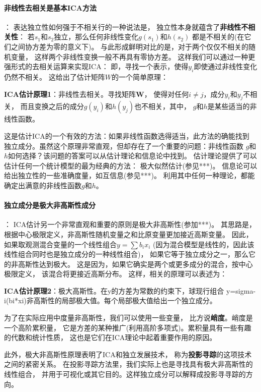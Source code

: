 \paragraph*{非线性去相关是基本ICA方法}：
表达独立性如何强于不相关行的一种说法是，
独立性本身就蕴含了\textbf{非线性不相关性}：
若$s_1$和$s_2$独立，那么任何非线性变化$g(s_1)$和$h(s_2)$
都是不相关的(在它们之间协方差为零的意义下)。
与此形成鲜明对比的是，对于两个仅仅不相关的随机变量，
这样两个非线性变换一般不再具有零协方差。
这样我们可以通过一种更强形式的去相关运算来实现ICA：
即，寻找一个表示，使得$y_i$即使通过非线性变化仍然不相关。
这给出了估计矩阵$W$的一个简单原理：

\textbf{ICA估计原理1}：非线性去相关。寻找矩阵$\bm{W}$，
使得对任何$i \ne j$，成分$y_i$和$y_j$不相关，
而且变换之后的成分$g(y_i)$和$h(y_j)$也不相关，其中，
$g$和$h$是某些适当的非线性函数。

这是估计ICA的一个有效的方法：如果非线性函数选得适当，此方法的确能找到
独立成分。虽然这个原理非常直观，但却存在了一个重要的问题：非线性函数
$g$和$h$如何选择？该问题的答案可以从估计理论和信息论中找到。
估计理论提供了可以估计任何一个统计模型的最为经典的方法：
极大似然估计(参见***)。
信息论可以给出独立性的一些准确度量，如互信息(参见***)。
利用其中任何一种理论，都能确定出满意的非线性函数$g$和$h$。
    
\paragraph*{独立成分是极大非高斯性成分}：
ICA估计另一个非常直观和重要的原则是极大非高斯性(参加***)。
其思路是，根据中心极限定义，非高斯性随机变量之和比原变量更加接近高斯变量。
因此，如果取观测混合变量的一个线性组合$y=\sum b_i x_i$
(因为混合模型是线性的，因此该线性组合同时也是独立成分的一种线性组合)，
如果它等于独立成分之一，那么它的非高斯性达到极大。
这是因为，如果它确实是两个或更多成分的混合，按中心极限定义，
该混合将更接近高斯分布。
    这样，相关的原理可以表述为：

	\textbf{ICA估计原理2}：极大高斯性。在y的方差为常数的约束下，球现行组合
	y=sigma-i(bi*xi)非高斯性的局部极大值。每个局部极大值给出一个独立成分。
    
	为了在实际应用中度量非高斯性，我们可以使用一些变量，
比方说\textbf{峭度}。峭度是一个高阶累积量，
它是方差的某种推广(利用高阶多项式)。累积量具有一些有趣的代数和统计性质，
这也是它们在ICA理论中起着重要作用的原因。
    
此外，极大非高斯性原理表明了ICA和独立发展技术，
称为\textbf{投影寻踪}的这项技术之间的紧密关系。
在投影寻踪方法里，我们实际上也是寻找具有极大非高斯性的线性组合，
并用于可视化或其它目的。这样独立成分可以解释成投影寻寻踪的方向。
    
